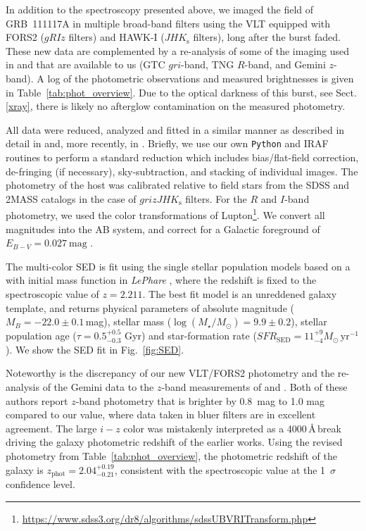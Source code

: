 \documentclass{aa}    %
\begin{document}
In addition to the spectroscopy presented above, we imaged the field of
GRB~111117A in multiple broad-band filters using the VLT equipped with FORS2
($gRIz$ filters) and HAWK-I ($JHK_{\mathrm{s}}$ filters), long after the burst
faded. These new data are complemented by a re-analysis of some of the imaging
used in \citet{Margutti2012} and \citet{Sakamoto2013} that are available to us
(GTC $gri$-band, TNG $R$-band, and Gemini $z$-band). A log of the photometric
observations and measured brightnesses is given in
Table~\ref{tab:phot_overview}. Due to the optical darkness of this burst, see
Sect. \ref{xray}, there is likely no afterglow contamination on the measured
photometry.

All data were reduced, analyzed and fitted in a similar manner as described in
detail in \citet{Kruhler2011a} and, more recently, in \citet{Schulze2016}.
Briefly, we use our own \texttt{Python} and IRAF routines to perform a standard
reduction which includes bias/flat-field correction, de-fringing (if necessary),
sky-subtraction, and stacking of individual images. The photometry of the host
was calibrated relative to field stars from the SDSS and 2MASS catalogs in the
case of $grizJHK_{\mathrm{s}}$ filters.
For the $R$ and $I$-band photometry, we used the color transformations of
Lupton\footnote{\url{https://www.sdss3.org/dr8/algorithms/sdssUBVRITransform.php}}. 
We convert all magnitudes into the AB system, and correct for a Galactic 
foreground of $E_{B-V}=0.027~\mathrm{mag}$ \citep{Schlegel1998, Schlafly2011}.



The multi-color SED is fit using the \citet{Bruzual2003} single stellar population
models based on a \citet{Chabrier2003} with initial mass function in
\emph{LePhare} \citep{Ilbert2006}, where the redshift is fixed to the
spectroscopic value of $z=2.211$. The best fit model is an unreddened galaxy
template, and returns physical parameters of absolute magnitude
($M_B=-22.0\pm0.1$\,mag), stellar mass ($\log(M_{\star}/M_\odot) = 9.9\pm0.2$),
stellar population age ($\tau = 0.5_{-0.3}^{+0.5}$ Gyr) and star-formation rate
($SFR_{\mathrm{SED}}=11_{-4}^{+9} M_\odot\,\mathrm{yr}^{-1}$). We show the SED
fit in Fig.~\ref{fig:SED}.

Noteworthy is the discrepancy of our new VLT/FORS2 photometry and the
re-analysis of the Gemini data to the $z$-band measurements of
\citet{Margutti2012} and \citet{Sakamoto2013}. Both of these authors report
$z$-band photometry that is brighter by 0.8~mag to 1.0 mag compared to our
value, where data taken in bluer filters are in excellent agreement. The large
$i-z$ color was mistakenly interpreted as a 4000\,\AA\,break driving the galaxy
photometric redshift of the earlier works. Using the revised photometry from
Table~\ref{tab:phot_overview}, the photometric redshift of the galaxy is
$z_{\mathrm{phot}}=2.04_{-0.21}^{+0.19}$, consistent with the spectroscopic
value at the 1~$\sigma$ confidence level.
\end{document}
